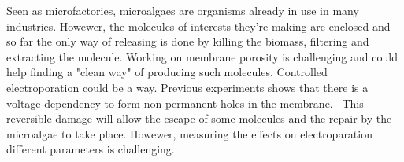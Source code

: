 Seen as microfactories, microalgaes are organisms already in use in many industries. Howewer, the molecules of interests they're making are enclosed and so far the only way of releasing is done by killing the biomass, filtering and extracting the molecule. Working on membrane porosity is challenging and could help finding a "clean way" of producing such molecules. Controlled electroporation could be a way. Previous experiments shows that there is a voltage dependency to form non permanent holes in the membrane.  This reversible damage will allow the escape of some molecules and the repair by the microalgae to take place. Howewer, measuring the effects on electroparation different parameters is challenging. 
